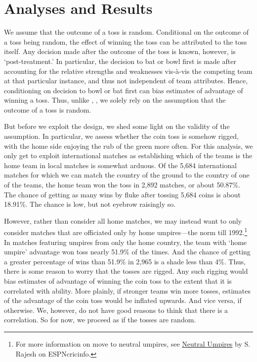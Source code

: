 \documentclass[12pt]{article}
\begin{document}
\section*{Analyses and Results}

We assume that the outcome of a toss is random. Conditional on the outcome of a toss being random, the effect of winning the toss can be attributed to the toss itself. Any decision made after the outcome of the toss is known, however, is `post-treatment.' In particular, the decision to bat or bowl first is made after accounting for the relative strengths and weaknesses vis-\`{a}-vis the competing team at that particular instance, and thus not independent of team attributes. Hence, conditioning on decision to bowl or bat first can bias estimates of advantage of winning a toss. Thus, unlike \citet{dawson2009bat}, \citet{Saad2015}, we solely rely on the assumption that the outcome of a toss is random. 

But before we exploit the design, we shed some light on the validity of the assumption. In particular, we assess whether the coin toss is somehow rigged, with the home side enjoying the rub of the green more often. For this analysis, we only get to exploit international matches as establishing which of the teams is the home team in local matches is somewhat arduous. Of the 5,684 international matches for which we can match the country of the ground to the country of one of the teams, the home team won the toss in 2,892 matches, or about 50.87\%. The chance of getting as many wins by fluke after tossing 5,684 coins is about 18.91\%. The chance is low, but not eyebrow raisingly so. 

However, rather than consider all home matches, we may instead want to only consider matches that are officiated only by home umpires---the norm till 1992.\footnote{For more information on move to neutral umpires, see \href{http://www.espncricinfo.com/magazine/content/story/511175.html}{Neutral Umpires} by S. Rajesh on ESPNcricinfo.} In matches featuring umpires from only the home country, the team with `home umpire' advantage won toss nearly 51.9\% of the times. And the chance of getting a greater percentage of wins than 51.9\% in 2,965 is a shade less than 4\%. Thus, there is some reason to worry that the tosses are rigged. Any such rigging would bias estimates of advantage of winning the coin toss to the extent that it is correlated with ability. More plainly, if stronger teams win more tosses, estimates of the advantage of the coin toss would be inflated upwards. And vice versa, if otherwise. We, however, do not have good reasons to think that there is a correlation. So for now, we proceed as if the tosses are random. 
\end{document}
